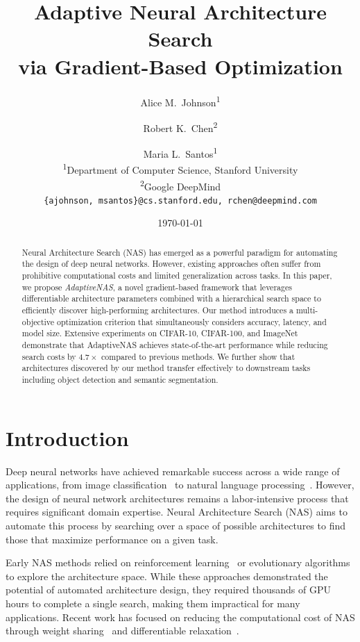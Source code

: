 \documentclass[12pt]{article}
\title{\textbf{Adaptive Neural Architecture Search\\via Gradient-Based Optimization}}
\author{
  Alice M.\ Johnson\textsuperscript{1} \and
  Robert K.\ Chen\textsuperscript{2} \and
  Maria L.\ Santos\textsuperscript{1}\\
  \textsuperscript{1}Department of Computer Science, Stanford University\\
  \textsuperscript{2}Google DeepMind\\
  \texttt{\{ajohnson, msantos\}@cs.stanford.edu, rchen@deepmind.com}
}
\date{\today}
\begin{document}
\maketitle

\begin{abstract}
Neural Architecture Search (NAS) has emerged as a powerful paradigm for automating the design of deep neural networks. However, existing approaches often suffer from prohibitive computational costs and limited generalization across tasks. In this paper, we propose \textit{AdaptiveNAS}, a novel gradient-based framework that leverages differentiable architecture parameters combined with a hierarchical search space to efficiently discover high-performing architectures. Our method introduces a multi-objective optimization criterion that simultaneously considers accuracy, latency, and model size. Extensive experiments on CIFAR-10, CIFAR-100, and ImageNet demonstrate that AdaptiveNAS achieves state-of-the-art performance while reducing search costs by $4.7\times$ compared to previous methods. We further show that architectures discovered by our method transfer effectively to downstream tasks including object detection and semantic segmentation.
\end{abstract}

\section{Introduction}

Deep neural networks have achieved remarkable success across a wide range of applications, from image classification~\citep{he2016deep} to natural language processing~\citep{vaswani2017attention}. However, the design of neural network architectures remains a labor-intensive process that requires significant domain expertise. Neural Architecture Search (NAS) aims to automate this process by searching over a space of possible architectures to find those that maximize performance on a given task.

Early NAS methods relied on reinforcement learning~\citep{zoph2017neural} or evolutionary algorithms~\citep{real2019regularized} to explore the architecture space. While these approaches demonstrated the potential of automated architecture design, they required thousands of GPU hours to complete a single search, making them impractical for many applications. Recent work has focused on reducing the computational cost of NAS through weight sharing~\citep{pham2018efficient} and differentiable relaxation~\citep{liu2019darts}.
\end{document}
